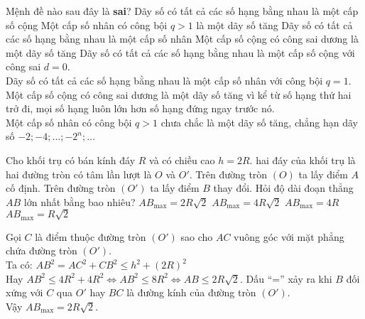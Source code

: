 \begin{ex}%
 Mệnh đề nào sau đây là \textbf{sai}?
 \choice
  {Dãy số có tất cả các số hạng bằng nhau là một cấp số cộng}
  {\True Một cấp số nhân có công bội $q > 1$ là một dãy số tăng}
  {Dãy số có tất cả các số hạng bằng nhau là một cấp số nhân}
  {Một cấp số cộng có công sai dương là một dãy số tăng}
 \loigiai
  {
  Dãy số có tất cả các số hạng bằng nhau là một cấp số cộng với công sai $d = 0$.\\
  Dãy số có tất cả các số hạng bằng nhau là một cấp số nhân với công bội $q = 1$.\\
  Một cấp số cộng có công sai dương là một dãy số tăng vì kể từ số hạng thứ hai trở đi, mọi số hạng luôn lớn hơn số hạng đứng ngay trước nó.\\
  Một cấp số nhân có công bội $q > 1$ chưa chắc là một dãy số tăng, chẳng hạn dãy số $-2; -4 ; \ldots ; -2^n; \ldots$
  }
\end{ex}


\begin{ex}%
 Cho khối trụ có bán kính đáy $R$ và có chiều cao $h = 2R$. hai đáy của khối trụ là hai đường tròn có tâm lần lượt là $O$ và $O'$. Trên đường tròn $(O)$ ta lấy điểm $A$ cố định. Trên đường tròn $(O')$ ta lấy điểm $B$ thay đổi. Hỏi độ dài đoạn thẳng $AB$ lớn nhất bằng bao nhiêu?
 \choice
  {\True $AB_{\max} = 2R\sqrt{2}$}
  {$AB_{\max} = 4R\sqrt{2}$}
  {$AB_{\max} = 4R$}
  {$AB_{\max} = R\sqrt{2}$}
 \loigiai
  {
  \immini
  {
  Gọi $C$ là điểm thuộc đường tròn $(O')$ sao cho $AC$ vuông góc với mặt phẳng chứa đường tròn $(O')$.\\
  Ta có: $AB^2 = AC^2 + CB^2  \leq h^2 + (2R)^2$\\
  Hay $AB^2 \leq 4R^2 + 4R^2 \Leftrightarrow AB^2 \leq 8R^2 \Leftrightarrow AB \leq 2R\sqrt{2}$.
  Dấu ``='' xảy ra khi $B$ đối xứng với $C$ qua $O'$ hay $BC$ là đường kính của đường tròn $(O')$.\\
  Vậy $AB_{\max} = 2R\sqrt{2}$.
  }
  {
  }
  }
\end{ex}


